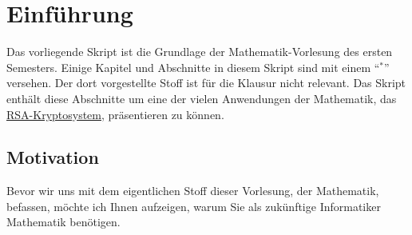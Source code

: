 \chapter{Einf\"{u}hrung}
Das vorliegende Skript ist die Grundlage der Mathematik-Vorlesung des ersten Semesters.
Einige Kapitel und Abschnitte in diesem Skript sind mit einem ``$^*$'' versehen.  
Der dort vorgestellte Stoff ist f\"{u}r die Klausur nicht relevant.  Das Skript enth\"{a}lt diese Abschnitte
um eine der vielen Anwendungen der Mathematik, das
\href{https://de.wikipedia.org/wiki/RSA-Kryptosystem}{RSA-Kryptosystem}, pr\"{a}sentieren zu k\"{o}nnen.  

\section{Motivation}
Bevor wir uns mit dem eigentlichen Stoff dieser Vorlesung, der Mathematik, befassen, m\"{o}chte ich
Ihnen aufzeigen, warum Sie als zuk\"{u}nftige Informatiker Mathematik ben\"{o}tigen.  
